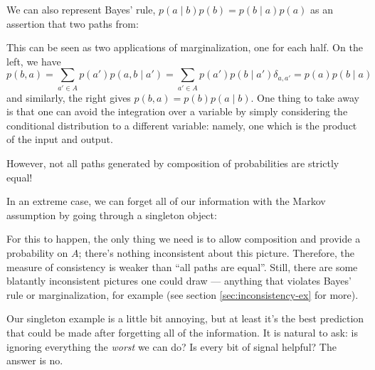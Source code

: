 \documentclass{article}
\begin{document}
	\begin{example} \label{ex:bayesrule}
		We can also represent Bayes' rule, $p(a \mid b) p(b) = p(b \mid a) p(a)$ as an assertion that two paths from:
		\begin{center}
		\end{center}
		This can be seen as two applications of marginalization, one for each half. On the left, we have
		\[ p(b, a) = \sum_{a' \in A} p(a')p(a,b \mid a') = \sum_{a' \in A} p(a') p(b \mid a') \delta_{a,a'} = p(a) p(b \mid a) \]
		and similarly, the right gives $p(b,a) = p(b) p(a \mid b)$. One thing to take away is that one can avoid the integration over a variable by simply considering the conditional distribution to a different variable: namely, one which is the product of the input and output. 
	\end{example}
	
	
	However, not all paths generated by composition of probabilities are strictly equal! 
	
	\begin{example}
		In an extreme case, we can forget all of our information with the Markov assumption by going through a singleton object:
		
		\begin{center}
		\end{center}
	\end{example}
	
	For this to happen, the only thing we need is to allow composition and provide a probability on $A$; there's nothing inconsistent about this picture. Therefore, the measure of consistency is weaker than ``all paths are equal''. Still, there are some blatantly inconsistent pictures one could draw --- anything that violates Bayes' rule or marginalization, for example (see section \ref{sec:inconsistency-ex} for more).
	
	Our singleton example is a little bit annoying, but at least it's the best prediction that could be made after forgetting all of the information. It is natural to ask: is ignoring everything the \emph{worst} we can do? Is every bit of signal helpful? The answer is no. %
	
\end{document}
